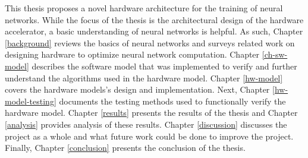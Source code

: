 This thesis proposes a novel hardware architecture for the training of neural networks. While the focus of the thesis is the architectural design of the hardware accelerator, a basic understanding of neural networks is helpful. As such, Chapter \ref{background} reviews the basics of neural networks and surveys related work on designing hardware to optimize neural network computation. Chapter \ref{ch-sw-model} describes the software model that was implemented to verify and further understand the algorithms used in the hardware model. Chapter \ref{hw-model} covers the hardware models's design and implementation. Next, Chapter \ref{hw-model-testing} documents the testing methods used to functionally verify the hardware model. Chapter \ref{results} presents the results of the thesis and Chapter \ref{analysis} provides analysis of these results. Chapter \ref{discussion} discusses the project as a whole and what future work could be done to improve the project. Finally, Chapter \ref{conclusion} presents the conclusion of the thesis.

